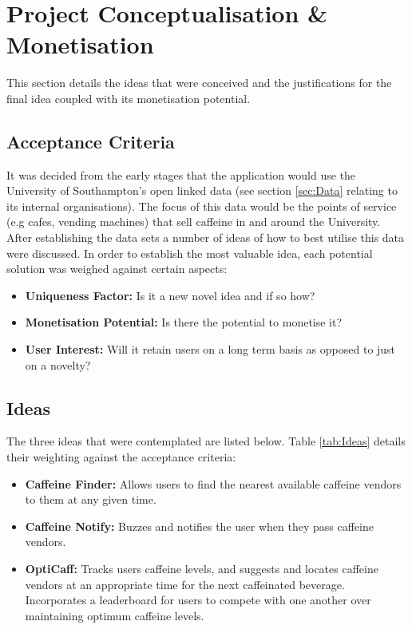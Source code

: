 \section{Project Conceptualisation \& Monetisation}

This section details the ideas that were conceived and the justifications for the final idea coupled with its monetisation potential. 

\subsection{Acceptance Criteria}
It was decided from the early stages that the application would use the University of Southampton's open linked data (see section \ref{sec:Data} relating to its internal organisations). 
The focus of this data would be the points of service (e.g cafes, vending machines) that sell caffeine in and around the University. 
After establishing the data sets a number of ideas of how to best utilise this data were discussed. 
In order to establish the most valuable idea, each potential solution was weighed against certain aspects: 

\begin{itemize}
	\item{\textbf{Uniqueness Factor:} Is it a new novel idea and if so how?}
	\item{\textbf{Monetisation Potential:} Is there the potential to monetise it?}
	\item{\textbf{User Interest:} Will it retain users on a long term basis as opposed to just on a novelty?}
\end{itemize}

\subsection{Ideas}
The three ideas that were contemplated are listed below. Table \ref{tab:Ideas} details their weighting against the acceptance criteria:

\begin{itemize}
	\item{\textbf{Caffeine Finder:} Allows users to find the nearest available caffeine vendors to them at any given time.}
	\item{\textbf{Caffeine Notify:} Buzzes and notifies the user when they pass caffeine vendors.}
	\item{\textbf{OptiCaff:} Tracks users caffeine levels, and suggests and locates caffeine vendors at an appropriate time for the next caffeinated beverage. Incorporates a leaderboard for users to compete with one another over maintaining optimum caffeine levels.}
\end{itemize}

